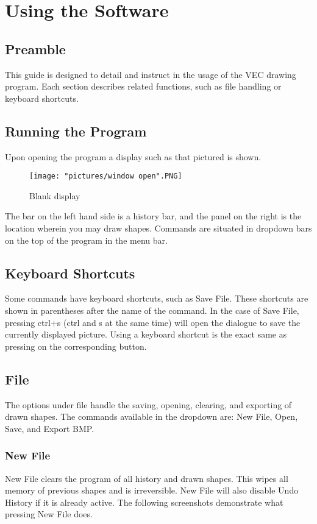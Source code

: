 \documentclass[12pt]{article} %
\begin{document}
\newpage

\section{Using the Software}

\subsection{Preamble}
This guide is designed to detail and instruct in the usage of the VEC drawing program. Each section describes related functions, such as file handling or keyboard shortcuts.

\subsection{Running the Program}
Upon opening the program a display such as that pictured is shown. 

\begin{figure}[hbtp]
\caption{Blank display}
\centering
\texttt{[image: "pictures/window open".PNG]}
\end{figure}


The bar on the left hand side is a history bar, and the panel on the right is the location wherein you may draw shapes. Commands are situated in dropdown bars on the top of the program in the menu bar. 

\subsection{Keyboard Shortcuts}
Some commands have keyboard shortcuts, such as Save File. These shortcuts are shown in parentheses after the name of the command. In the case of Save File, pressing ctrl+s (ctrl and s at the same time) will open the dialogue to save the currently displayed picture. Using a keyboard shortcut is the exact same as pressing on the corresponding button.

\subsection{File}
The options under file handle the saving, opening, clearing, and exporting of drawn shapes. The commands available in the dropdown are: New File, Open, Save, and Export BMP.

\subsubsection{New File}
New File clears the program of all history and drawn shapes. This wipes all memory of previous shapes and is irreversible. New File will also disable Undo History if it is already active. The following screenshots demonstrate what pressing New File does.
\end{document}
